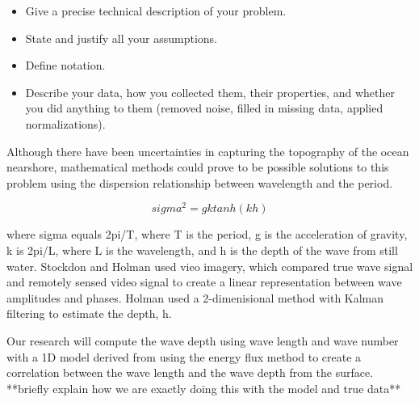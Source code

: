 \begin{itemize}
\item Give a precise technical description of your problem. 

\item State and justify all your assumptions. 

\item Define notation. 

\item Describe your data, how you collected them, their properties,
and whether you did 
anything to them (removed noise, filled in missing data, 
applied normalizations).
\end{itemize}


Although there have been uncertainties in capturing the topography of the ocean nearshore, mathematical methods could prove to be possible solutions to this problem using the dispersion relationship between wavelength and the period.

 $$sigma^2=gktanh(kh)$$

where sigma equals 2pi/T, where T is the period, g is the acceleration of gravity, k is 2pi/L, where L is the wavelength, and h is the depth of the wave from still water. Stockdon and Holman used vieo imagery, which compared true wave signal and remotely sensed video signal to create a linear representation between wave amplitudes and phases. Holman used a 2-dimenisional method with Kalman filtering to estimate the depth, h.

Our research will compute the wave depth using wave length and wave number with a 1D model derived from using the energy flux method to create a correlation between the wave length and the wave depth from the surface. **briefly explain how we are exactly doing this with the model and true data**